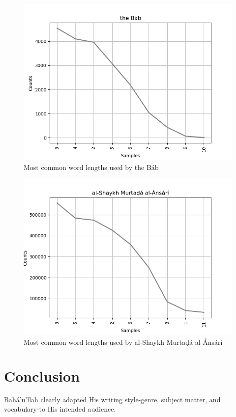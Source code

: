 \documentclass[12pt, oneside]{report}
\begin{document}
\begin{figure}[htb]
	\centering
	\includegraphics[width=15cm]{figures/word-length-bab.png}
	\caption[Most common word lengths used by the B\'{a}b]{Most common word lengths used by the B\'{a}b}
	\label{fig:word-length-bab}
\end{figure}
\begin{figure}[htb]
	\centering
	\includegraphics[width=15cm]{figures/word-length-shaykh-murtada.png}
	\caption[Most common word lengths used by al-Shaykh Murtaḍ\'{a} al-\'{A}ns\'{a}r\'{i}]{Most common word lengths used by al-Shaykh Murtaḍ\'{a} al-\'{A}ns\'{a}r\'{i}}
	\label{fig:word-length-murtada-ansari}
\end{figure}
\section{Conclusion}
Bah\'{a}'u'llah clearly adapted His writing style-genre, subject matter, and vocabulary-to His intended audience. 
\end{document}
